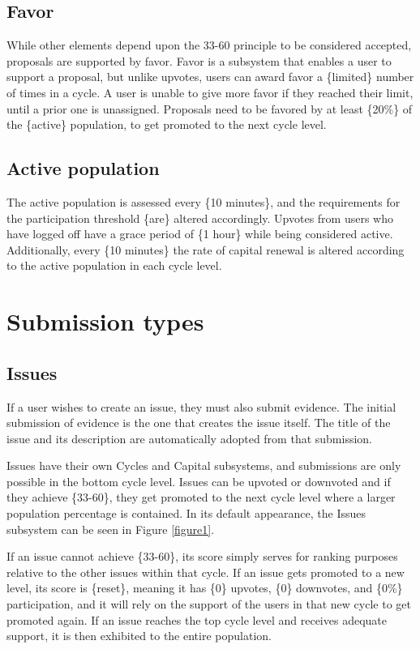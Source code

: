 \documentclass[a4paper,11pt]{article}
\begin{document}
\begin{multicols}{2}
\subsection{Favor} \label{favor}

While other elements depend upon the 33-60 principle to be considered accepted, proposals are supported by favor. Favor is a subsystem that enables a user to support a proposal, but unlike upvotes, users can award favor a \{limited\} number of times in a cycle. A user is unable to give more favor if they reached their limit, until a prior one is unassigned. Proposals need to be favored by at least \{20\%\} of the \{active\} population, to get promoted to the next cycle level.

\subsection{Active population} \label{active}

The active population is assessed every \{10 minutes\}, and the requirements for the participation threshold \{are\} altered accordingly. Upvotes from users who have logged off have a grace period of \{1 hour\} while being considered active. Additionally, every \{10 minutes\} the rate of capital renewal is altered according to the active population in each cycle level.

\section{Submission types} \label{submissiontypes}

\subsection{Issues} \label{issues}

If a user wishes to create an issue, they must also submit evidence. The initial submission of evidence is the one that creates the issue itself. The title of the issue and its description are automatically adopted from that submission.

Issues have their own Cycles and Capital subsystems, and submissions are only possible in the bottom cycle level. Issues can be upvoted or downvoted and if they achieve \{33-60\}, they get promoted to the next cycle level where a larger population percentage is contained. In its default appearance, the Issues subsystem can be seen in Figure \ref{figure1}.

If an issue cannot achieve \{33-60\}, its score simply serves for ranking purposes relative to the other issues within that cycle. If an issue gets promoted to a new level, its score is \{reset\}, meaning it has \{0\} upvotes, \{0\} downvotes, and \{0\%\} participation, and it will rely on the support of the users in that new cycle to get promoted again. If an issue reaches the top cycle level and receives adequate support, it is then exhibited to the entire population.


\end{multicols}
\end{document}
